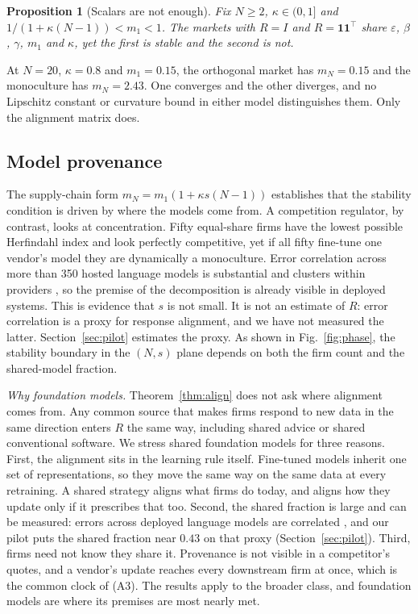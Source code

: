 \documentclass[conference]{IEEEtran}
\newtheorem{proposition}{Proposition}
\theoremstyle{definition}
\newcommand{\ones}{\mathbf{1}\mathbf{1}^{\top}}
\begin{document}
\begin{proposition}[Scalars are not enough]\label{prop:scalars}
Fix $N \ge 2$, $\kappa \in (0,1]$ and $1/(1+\kappa(N-1)) < m_1 < 1$. The
markets with $R = I$ and $R = \ones$ share $\varepsilon$, $\beta$, $\gamma$,
$m_1$ and $\kappa$, yet the first is stable and the second is not.
\end{proposition}

At $N = 20$, $\kappa = 0.8$ and $m_1 = 0.15$, the orthogonal market has
$m_N = 0.15$ and the monoculture has $m_N = 2.43$. One converges and the other
diverges, and no Lipschitz constant or curvature bound in either model
distinguishes them. Only the alignment matrix does.

\subsection{Model provenance}\label{sec:provenance}
The supply-chain form $m_N = m_1(1 + \kappa s(N-1))$ establishes that the
stability condition is driven by where the models come from. A competition
regulator, by contrast, looks at concentration. Fifty equal-share firms have
the lowest possible Herfindahl index \cite{hirschman1964} and look perfectly
competitive, yet if all fifty fine-tune one vendor's model they are
dynamically a monoculture. Error correlation across more than 350 hosted
language models is substantial and clusters within providers \cite{kim2025},
so the premise of the decomposition is already visible in deployed systems.
This is evidence that $s$ is not small. It is not an estimate of $R$: error
correlation is a proxy for response alignment, and we have not measured the
latter. Section~\ref{sec:pilot} estimates the proxy. As shown in
Fig.~\ref{fig:phase}, the stability boundary in the $(N,s)$ plane depends on
both the firm count and the shared-model fraction.

\emph{Why foundation models.} Theorem~\ref{thm:align} does not ask where
alignment comes from. Any common source that makes firms respond to new data
in the same direction enters $R$ the same way, including shared advice or
shared conventional software. We stress shared foundation models for three
reasons. First, the alignment sits in the learning rule itself. Fine-tuned
models inherit one set of representations, so they move the same way on the
same data at every retraining. A shared strategy aligns what firms do today,
and aligns how they update only if it prescribes that too. Second, the shared
fraction is large and can be measured: errors across deployed language models
are correlated \cite{kim2025}, and our pilot puts the shared fraction near
$0.43$ on that proxy (Section~\ref{sec:pilot}). Third, firms need not know
they share it. Provenance is not visible in a competitor's quotes, and a
vendor's update reaches every downstream firm at once, which is the common
clock of (A3). The results apply to the broader class, and foundation models
are where its premises are most nearly met.
\end{document}
